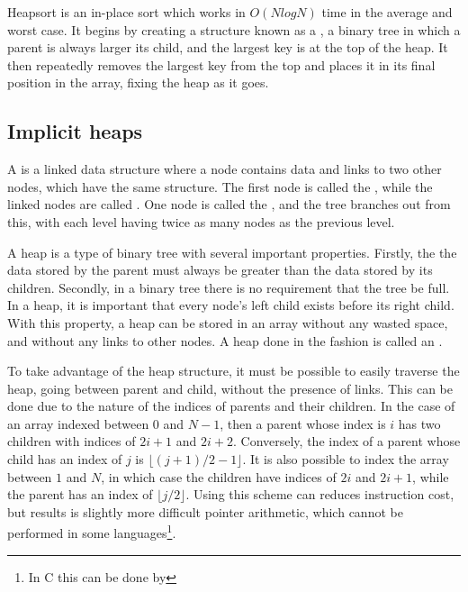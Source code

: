 \label{heap}

Heapsort is an in-place sort which works in $O(NlogN)$ time in the average and
worst case. It begins by creating a structure known as a , a binary tree
in which a parent is always larger its child, and the largest key is at the top
of the heap. It then repeatedly removes the largest key from the top and places
it in its final position in the array, fixing the heap as it goes.

\subsection{Implicit heaps}

A  is a linked data structure where a node contains data and links
to two other nodes, which have the same structure. The first node is called the
, while the linked nodes are called . One node is called the
, and the tree branches out from this, with each level having twice as many
nodes as the previous level.

A heap is a type of binary tree with several important properties. Firstly, the
the data stored by the parent must always be greater than the data stored by its
children. Secondly, in a binary tree there is no requirement that the tree be full.
In a heap, it is important that every node's left child exists before its right
child. With this property, a heap can be stored in an array without any wasted
space, and without any links to other nodes. A heap done in the fashion is
called an .

To take advantage of the heap structure, it must be possible to easily traverse
the heap, going between parent and child, without the presence of links. This
can be done due to the nature of the indices of parents and their children. In
the case of an array indexed between $0$ and $N-1$, then a 
parent whose index is $i$ has two children with indices of
$2i+1$ and $2i+2$. Conversely, the index of a parent whose child has an index
of $j$ is $\lfloor{}(j+1)/2-1\rfloor{}$. It is also possible to index the array between $1$
and $N$, in which case the children have indices of $2i$ and $2i+1$, while the parent
has an index of $\lfloor{}j/2\rfloor{}$. Using this scheme can reduces instruction cost, but
results is slightly more difficult pointer arithmetic, which cannot be performed
in some languages\footnote{In C this can be done by }.

